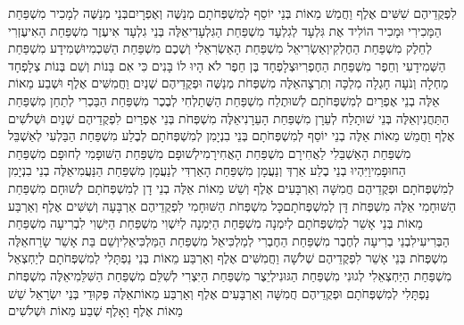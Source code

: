 \documentclass[../main/main.tex]{subfiles}
\begin{document}
\begin{multicols*}{\ncols}
לִפְקֻדֵיהֶם שִׁשִּׁים אֶלֶף וַחֲמֵשׁ מֵאוֹת \ClosedSection{}בְּנֵי יוֹסֵף לְמִשְׁפְּחֹתָם מְנַשֶּׁה וְאֶפְרָיִם\PreVerseSpace{}בְּנֵי מְנַשֶּׁה לְמָכִיר מִשְׁפַּחַת הַמָּכִירִי וּמָכִיר הוֹלִיד אֶת גִּלְעָד לְגִלְעָד מִשְׁפַּחַת הַגִּלְעָדִי\PreVerseSpace{}אֵלֶּה בְּנֵי גִלְעָד אִיעֶזֶר מִשְׁפַּחַת הָאִיעֶזְרִי לְחֵלֶק מִשְׁפַּחַת הַחֶלְקִי\PreVerseSpace{}וְאַשְׂרִיאֵל מִשְׁפַּחַת הָאַשְׂרִאֵלִי וְשֶׁכֶם מִשְׁפַּחַת הַשִּׁכְמִי\PreVerseSpace{}וּשְׁמִידָע מִשְׁפַּחַת הַשְּׁמִידָעִי וְחֵפֶר מִשְׁפַּחַת הַחֶפְרִי\PreVerseSpace{}וּצְלָפְחָד בֶּן חֵפֶר לֹא הָיוּ לוֹ בָּנִים כִּי אִם בָּנוֹת וְשֵׁם בְּנוֹת צְלָפְחָד מַחְלָה וְנֹעָה חָגְלָה מִלְכָּה וְתִרְצָה\PreVerseSpace{}אֵלֶּה מִשְׁפְּחֹת מְנַשֶּׁה וּפְקֻדֵיהֶם שְׁנַיִם וַחֲמִשִּׁים אֶלֶף וּשְׁבַע מֵאוֹת \ClosedSection{}אֵלֶּה בְנֵי אֶפְרַיִם לְמִשְׁפְּחֹתָם לְשׁוּתֶלַח מִשְׁפַּחַת הַשֻּׁתַלְחִי לְבֶכֶר מִשְׁפַּחַת הַבַּכְרִי לְתַחַן מִשְׁפַּחַת הַתַּחֲנִי\PreVerseSpace{}וְאֵלֶּה בְּנֵי שׁוּתָלַח לְעֵרָן מִשְׁפַּחַת הָעֵרָנִי\PreVerseSpace{}אֵלֶּה מִשְׁפְּחֹת בְּנֵי אֶפְרַיִם לִפְקֻדֵיהֶם שְׁנַיִם וּשְׁלֹשִׁים אֶלֶף וַחֲמֵשׁ מֵאוֹת אֵלֶּה בְנֵי יוֹסֵף לְמִשְׁפְּחֹתָם \ClosedSection{}בְּנֵי בִנְיָמִן לְמִשְׁפְּחֹתָם לְבֶלַע מִשְׁפַּחַת הַבַּלְעִי לְאַשְׁבֵּל מִשְׁפַּחַת הָאַשְׁבֵּלִי לַאֲחִירָם מִשְׁפַּחַת הָאֲחִירָמִי\PreVerseSpace{}לְשׁוּפָם\SubEnd{} מִשְׁפַּחַת הַשּׁוּפָמִי לְחוּפָם מִשְׁפַּחַת הַחוּפָמִי\PreVerseSpace{}וַיִּהְיוּ בְנֵי בֶלַע אַרְדְּ וְנַעֲמָן מִשְׁפַּחַת הָאַרְדִּי לְנַעֲמָן מִשְׁפַּחַת הַנַּעֲמִי\PreVerseSpace{}אֵלֶּה בְנֵי בִנְיָמִן לְמִשְׁפְּחֹתָם וּפְקֻדֵיהֶם חֲמִשָּׁה וְאַרְבָּעִים אֶלֶף וְשֵׁשׁ מֵאוֹת \ClosedSection{}אֵלֶּה בְנֵי דָן לְמִשְׁפְּחֹתָם לְשׁוּחָם מִשְׁפַּחַת הַשּׁוּחָמִי אֵלֶּה מִשְׁפְּחֹת דָּן לְמִשְׁפְּחֹתָם\PreVerseSpace{}כָּל מִשְׁפְּחֹת הַשּׁוּחָמִי לִפְקֻדֵיהֶם אַרְבָּעָה וְשִׁשִּׁים אֶלֶף וְאַרְבַּע מֵאוֹת \ClosedSection{}בְּנֵי אָשֵׁר לְמִשְׁפְּחֹתָם לְיִמְנָה מִשְׁפַּחַת הַיִּמְנָה לְיִשְׁוִי מִשְׁפַּחַת הַיִּשְׁוִי לִבְרִיעָה מִשְׁפַּחַת הַבְּרִיעִי\PreVerseSpace{}לִבְנֵי בְרִיעָה לְחֶבֶר מִשְׁפַּחַת הַחֶבְרִי לְמַלְכִּיאֵל מִשְׁפַּחַת הַמַּלְכִּיאֵלִי\PreVerseSpace{}וְשֵׁם בַּת אָשֵׁר שָׂרַח\PreVerseSpace{}אֵלֶּה מִשְׁפְּחֹת בְּנֵי אָשֵׁר לִפְקֻדֵיהֶם שְׁלֹשָׁה וַחֲמִשִּׁים אֶלֶף וְאַרְבַּע מֵאוֹת \ClosedSection{}בְּנֵי נַפְתָּלִי לְמִשְׁפְּחֹתָם לְיַחְצְאֵל מִשְׁפַּחַת הַיַּחְצְאֵלִי לְגוּנִי מִשְׁפַּחַת הַגּוּנִי\PreVerseSpace{}לְיֵצֶר מִשְׁפַּחַת הַיִּצְרִי לְשִׁלֵּם מִשְׁפַּחַת הַשִּׁלֵּמִי\PreVerseSpace{}אֵלֶּה מִשְׁפְּחֹת נַפְתָּלִי לְמִשְׁפְּחֹתָם וּפְקֻדֵיהֶם חֲמִשָּׁה וְאַרְבָּעִים אֶלֶף וְאַרְבַּע מֵאוֹת\PreVerseSpace{}אֵלֶּה פְּקוּדֵי בְּנֵי יִשְׂרָאֵל שֵׁשׁ מֵאוֹת אֶלֶף וָאָלֶף שְׁבַע מֵאוֹת וּשְׁלֹשִׁים\OpenSection{}\par

\end{multicols*}
\end{document}
